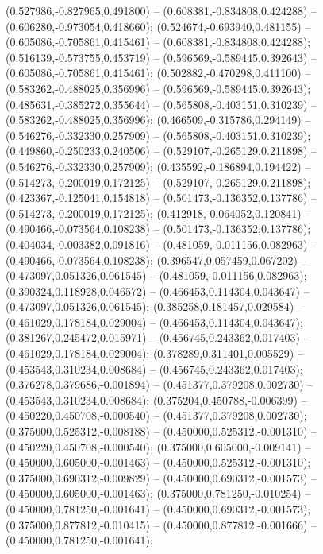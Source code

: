  (0.527986,-0.827965,0.491800) -- (0.608381,-0.834808,0.424288) -- (0.606280,-0.973054,0.418660);
 (0.524674,-0.693940,0.481155) -- (0.605086,-0.705861,0.415461) -- (0.608381,-0.834808,0.424288);
 (0.516139,-0.573755,0.453719) -- (0.596569,-0.589445,0.392643) -- (0.605086,-0.705861,0.415461);
 (0.502882,-0.470298,0.411100) -- (0.583262,-0.488025,0.356996) -- (0.596569,-0.589445,0.392643);
 (0.485631,-0.385272,0.355644) -- (0.565808,-0.403151,0.310239) -- (0.583262,-0.488025,0.356996);
 (0.466509,-0.315786,0.294149) -- (0.546276,-0.332330,0.257909) -- (0.565808,-0.403151,0.310239);
 (0.449860,-0.250233,0.240506) -- (0.529107,-0.265129,0.211898) -- (0.546276,-0.332330,0.257909);
 (0.435592,-0.186894,0.194422) -- (0.514273,-0.200019,0.172125) -- (0.529107,-0.265129,0.211898);
 (0.423367,-0.125041,0.154818) -- (0.501473,-0.136352,0.137786) -- (0.514273,-0.200019,0.172125);
 (0.412918,-0.064052,0.120841) -- (0.490466,-0.073564,0.108238) -- (0.501473,-0.136352,0.137786);
 (0.404034,-0.003382,0.091816) -- (0.481059,-0.011156,0.082963) -- (0.490466,-0.073564,0.108238);
 (0.396547,0.057459,0.067202) -- (0.473097,0.051326,0.061545) -- (0.481059,-0.011156,0.082963);
 (0.390324,0.118928,0.046572) -- (0.466453,0.114304,0.043647) -- (0.473097,0.051326,0.061545);
 (0.385258,0.181457,0.029584) -- (0.461029,0.178184,0.029004) -- (0.466453,0.114304,0.043647);
 (0.381267,0.245472,0.015971) -- (0.456745,0.243362,0.017403) -- (0.461029,0.178184,0.029004);
 (0.378289,0.311401,0.005529) -- (0.453543,0.310234,0.008684) -- (0.456745,0.243362,0.017403);
 (0.376278,0.379686,-0.001894) -- (0.451377,0.379208,0.002730) -- (0.453543,0.310234,0.008684);
 (0.375204,0.450788,-0.006399) -- (0.450220,0.450708,-0.000540) -- (0.451377,0.379208,0.002730);
 (0.375000,0.525312,-0.008188) -- (0.450000,0.525312,-0.001310) -- (0.450220,0.450708,-0.000540);
 (0.375000,0.605000,-0.009141) -- (0.450000,0.605000,-0.001463) -- (0.450000,0.525312,-0.001310);
 (0.375000,0.690312,-0.009829) -- (0.450000,0.690312,-0.001573) -- (0.450000,0.605000,-0.001463);
 (0.375000,0.781250,-0.010254) -- (0.450000,0.781250,-0.001641) -- (0.450000,0.690312,-0.001573);
 (0.375000,0.877812,-0.010415) -- (0.450000,0.877812,-0.001666) -- (0.450000,0.781250,-0.001641);

